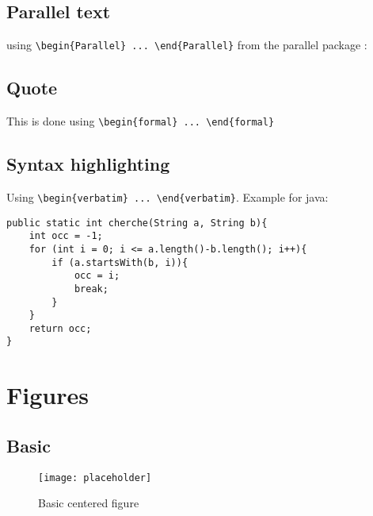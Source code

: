 \documentclass{customSynthesis}
\begin{document}
\subsection*{Parallel text}

using \verb|\begin{Parallel} ... \end{Parallel}| from the parallel package :

\begin{Parallel}[v]{0.45\textwidth}{0.45\textwidth}
\ParallelLText{
\lipsum[1][1]
}
\ParallelRText{
\lipsum[1][2]
}
\ParallelPar
\end{Parallel}

\subsection*{Quote}

\begin{formal}
This is done using \verb|\begin{formal} ... \end{formal}|
\end{formal}

\subsection*{Syntax highlighting}

Using \verb|\begin{verbatim} ... \end{verbatim}|. Example for java:

\begin{verbatim}
public static int cherche(String a, String b){
    int occ = -1;
    for (int i = 0; i <= a.length()-b.length(); i++){
        if (a.startsWith(b, i)){
            occ = i;
            break;
        }
    }
    return occ;
}
\end{verbatim}

\section*{Figures}

\subsection*{Basic}

\begin{figure}[H]
    \centering
    \texttt{[image: placeholder]}
    \caption{Basic centered figure}
\end{figure}
\end{document}
